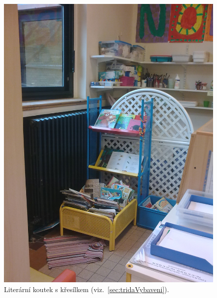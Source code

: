 	\begin{figure}[tb]
		\centering
		\includegraphics[height = 0.35\textheight]{./fotky/Obr3.jpg}
		\caption{
			Literární koutek s křesílkem (viz.~\ref{sec:tridaVybaveni}).
		}
		\label{Obr3}
	\end{figure}

